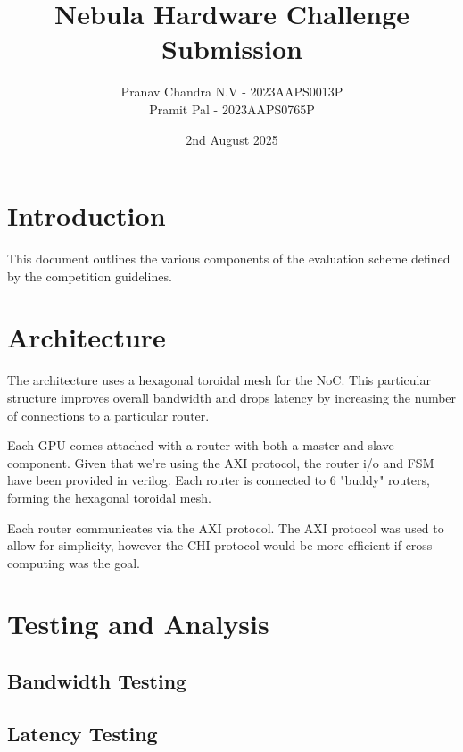 \documentclass{article}
\author{Pranav Chandra N.V - 2023AAPS0013P \\ Pramit Pal - 2023AAPS0765P}
\date{2nd August 2025}
\title{Nebula Hardware Challenge Submission}
\begin{document}
	\maketitle
	\tableofcontents
	
	\newpage

	\section{Introduction}
	This document outlines the various components of the evaluation scheme defined by the competition 	guidelines.

	\section{Architecture}
	The architecture uses a hexagonal toroidal mesh for the NoC. This particular structure improves overall bandwidth and drops latency by increasing the number of connections to a particular router.

	Each GPU comes attached with a router with both a master and slave component. Given that we're using the AXI protocol, the router i/o and FSM have been provided in verilog. Each router is connected to 6 "buddy" routers, forming the hexagonal toroidal mesh. 

	Each router communicates via the AXI protocol. The AXI protocol was used to allow for simplicity, however the CHI protocol would be more efficient if cross-computing was the goal.

	\section{Testing and Analysis}
	\subsection{Bandwidth Testing}
	\subsection{Latency Testing}
\end{document}

